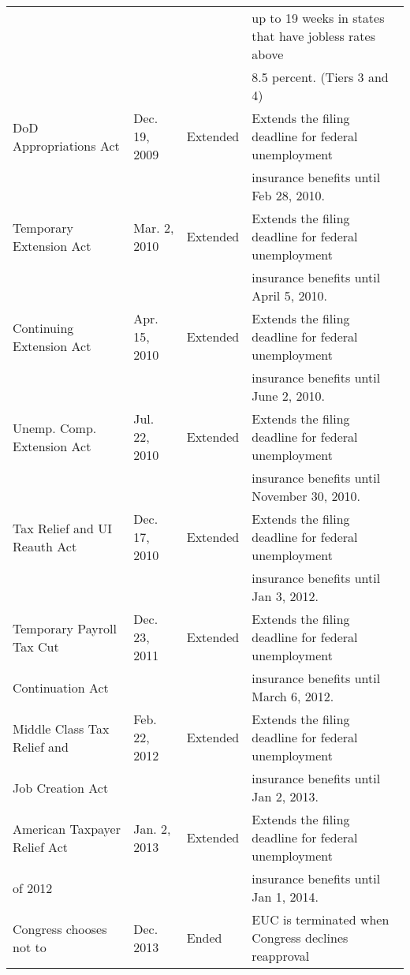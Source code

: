\documentclass[12pt]{article}
\begin{document}
\begin{spacing}{2}
\begin{sidewaystable}
\begin{threeparttable}
\begin{tabular}{llll}
     &&&                                                   up to 19 weeks in states that have jobless rates above\\
     &&&                                                   8.5 percent. (Tiers 3 and 4)\\
DoD Appropriations Act & Dec. 19, 2009& Extended&Extends the filing deadline for federal unemployment\\
      &&&                                                  insurance benefits until Feb 28, 2010. \\
Temporary Extension Act & Mar. 2, 2010& Extended&Extends the filing deadline for federal unemployment\\
      &&&                                                  insurance benefits until April 5, 2010. \\
Continuing Extension Act & Apr. 15, 2010& Extended&Extends the filing deadline for federal unemployment\\
      &&&                                                  insurance benefits until June 2, 2010. \\
Unemp. Comp. Extension Act & Jul. 22, 2010& Extended&Extends the filing deadline for federal unemployment\\
      &&&                                                  insurance benefits until November 30, 2010. \\
Tax Relief and UI Reauth Act & Dec. 17, 2010& Extended&Extends the filing deadline for federal unemployment\\
      &&&                                                  insurance benefits until Jan 3, 2012. \\
Temporary Payroll Tax Cut  & Dec. 23, 2011& Extended&Extends the filing deadline for federal unemployment\\
 Continuation Act     &&&                            insurance benefits until March 6, 2012. \\
Middle Class Tax Relief and & Feb. 22, 2012& Extended&Extends the filing deadline for federal unemployment\\
  Job Creation Act     &&&                            insurance benefits until Jan 2, 2013. \\
American Taxpayer Relief Act & Jan. 2, 2013 & Extended&Extends the filing deadline for federal unemployment\\
 of 2012      &&&                                                  insurance benefits until Jan 1, 2014. \\
Congress chooses not to  & Dec. 2013 & Ended  & EUC is terminated when Congress declines reapproval\\

\end{tabular}
\end{threeparttable}
\end{sidewaystable}
\end{spacing}
\end{document}
